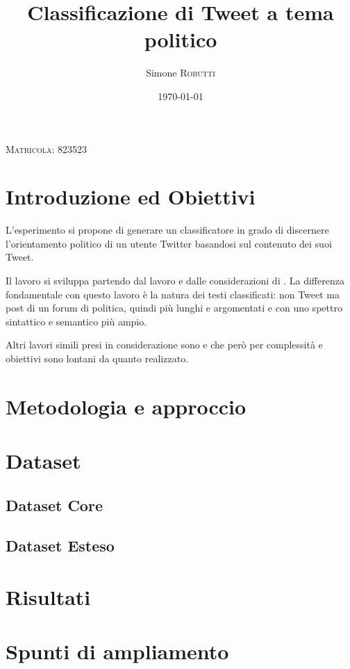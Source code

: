 \documentclass{article}
\title{Classificazione di Tweet a tema politico} %
\date{\today} %
\author{Simone \textsc{Robutti}} %
\begin{document}
\maketitle %
\begin{center}
\textsc{Matricola: 823523}

\end{center} 


\tableofcontents


\section{Introduzione ed Obiettivi}
L'esperimento si propone di generare un classificatore in grado di discernere l'orientamento politico di un utente Twitter basandosi sul contenuto dei suoi Tweet.

Il lavoro si sviluppa partendo dal lavoro e dalle considerazioni di \cite{sides}. La differenza fondamentale con questo lavoro è la natura dei testi classificati: non Tweet ma post di un forum di politica, quindi più lunghi e argomentati e con uno spettro sintattico e semantico più ampio.

Altri lavori simili presi in considerazione sono \cite{pennacchiotti} e \cite{durant} che però per complessità e obiettivi sono lontani da quanto realizzato.

\section{Metodologia e approccio}

\section{Dataset}
\subsection{Dataset Core}
\subsection{Dataset Esteso}
\section{Risultati}
\section{Spunti di ampliamento}

\nocite{*}
\printbibliography
\end{document}

